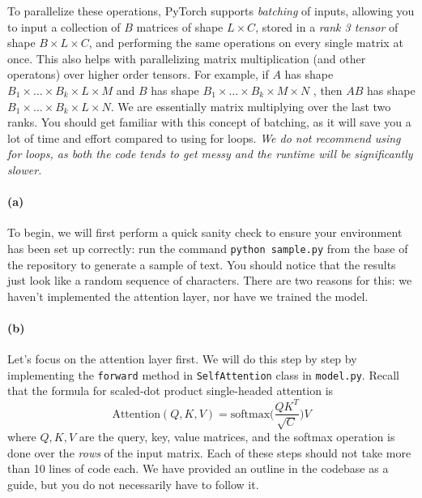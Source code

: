 \documentclass{exam}
\begin{document}
To parallelize these operations, PyTorch supports \textit{batching} of inputs, allowing you to input a collection of $B$ matrices of shape $L \times C$, stored in a \textit{rank 3 tensor} of shape $B \times L \times C$, and performing the same operations on every single matrix at once. This also helps with parallelizing matrix multiplication (and other operatons) over higher order tensors. For example, if $A$ has shape $B_1 \times \ldots \times B_k \times L \times M$ and $B$ has shape $B_1 \times \ldots \times B_k \times M \times N$ , then $AB$ has shape $B_1 \times \ldots \times B_k \times L \times N$. We are essentially matrix multiplying over the last two ranks. You should get familiar with this concept of batching, as it will save you a lot of time and effort compared to using for loops. \textit{We do not recommend using for loops, as both the code tends to get messy and the runtime will be significantly slower.}

\paragraph{(a)} To begin, we will first perform a quick sanity check to ensure your environment has been set up correctly: run the command \texttt{python sample.py} from the base of the repository to generate a sample of text. You should notice that the results just look like a random sequence of characters. There are two reasons for this: we haven't implemented the attention layer, nor have we trained the model.



\paragraph{(b)}  Let's focus on the attention layer first. We will do this step by step by implementing the \texttt{forward} method in \texttt{SelfAttention} class in \texttt{model.py}. Recall that the formula for scaled-dot product single-headed attention is 
\begin{equation} 
  \mathrm{Attention}(Q, K, V) = \mathrm{softmax} \bigg( \frac{Q K^T}{\sqrt{C}} \bigg) V
\end{equation} 
where $Q, K, V$ are the query, key, value matrices, and the softmax operation is done over the \textit{rows} of the input matrix. Each of these steps should not take more than 10 lines of code each. We have provided an outline in the codebase as a guide, but you do not necessarily have to follow it. 
\end{document}
